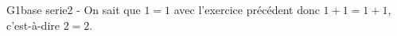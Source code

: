   G1base serie2 - On sait que $1=1$ avec l’exercice précédent donc $1+1=1+1$,
  c’est-à-dire $2=2$.
